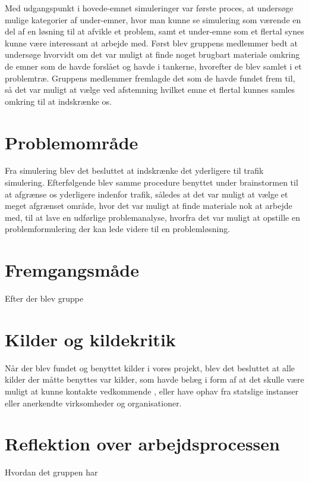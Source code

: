 Med udgangspunkt i hovede-emnet simuleringer var første proces, at undersøge mulige kategorier af under-emner, hvor man kunne se simulering som værende en del af en løsning til at afvikle et problem, samt et under-emne som et flertal synes kunne være interessant at arbejde med. Først blev gruppens medlemmer bedt at undersøge hvorvidt om det var muligt at finde noget brugbart materiale omkring de emner som de havde forslået og havde i tankerne, hvorefter de blev samlet i et problemtræ. Gruppens medlemmer fremlagde det som de havde fundet frem til, så det var muligt at vælge ved afstemning hvilket emne et flertal kunnes samles omkring til at indskrænke os.

\section{Problemområde}

Fra simulering blev det besluttet at indskrænke det yderligere til trafik simulering. Efterfølgende blev samme procedure benyttet under brainstormen til at afgrænse os yderligere indenfor trafik, således at det var muligt at vælge et meget afgrænset område, hvor det var muligt at finde materiale nok at arbejde med, til at lave en udførlige problemanalyse, hvorfra det var muligt at opstille en problemformulering der kan lede videre til en problemløsning. 

\section{Fremgangsmåde}

Efter der blev gruppe

\section{Kilder og kildekritik}

Når der blev fundet og benyttet kilder i vores projekt, blev det besluttet at alle kilder der måtte benyttes var kilder, som havde belæg i form af at det skulle være muligt at kunne kontakte vedkommende , eller have ophav fra statslige instanser eller anerkendte virksomheder og organisationer. 

\section{Reflektion over arbejdsprocessen}\label{Reflektion-over-arbejdsprocessen}
Hvordan det gruppen har 